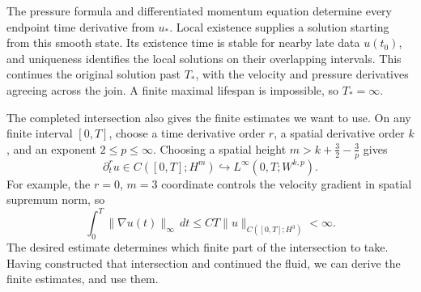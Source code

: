 The pressure formula and differentiated momentum equation determine every
endpoint time derivative from \(u_*\). Local existence supplies a solution
starting from this smooth state. Its existence time is stable for nearby
late data \(u(t_0)\), and uniqueness identifies the local solutions on their
overlapping intervals. This continues the original solution past \(T_*\),
with the velocity and pressure derivatives agreeing across the join. A finite
maximal lifespan is impossible, so \(T_*=\infty\).

The completed intersection also gives the finite estimates we want to use.
On any finite interval \([0,T]\), choose a time derivative order \(r\), a
spatial derivative order \(k\), and an exponent \(2\le p\le\infty\).
Choosing a spatial height \(m>k+\tfrac32-\tfrac3p\) gives
\[
 \partial_t^ru\in C([0,T];H^m)
 \hookrightarrow L^\infty(0,T;W^{k,p}).
\]
For example, the \(r=0\), \(m=3\) coordinate controls the velocity gradient
in spatial supremum norm, so
\[
 \int_0^T\|\nabla u(t)\|_\infty\,dt
 \le C T\|u\|_{C([0,T];H^3)}<\infty.
\]
The desired estimate determines which finite part of the intersection to
take. Having constructed that intersection and continued the fluid, we can
derive the finite estimates, and use them.

\endgroup

